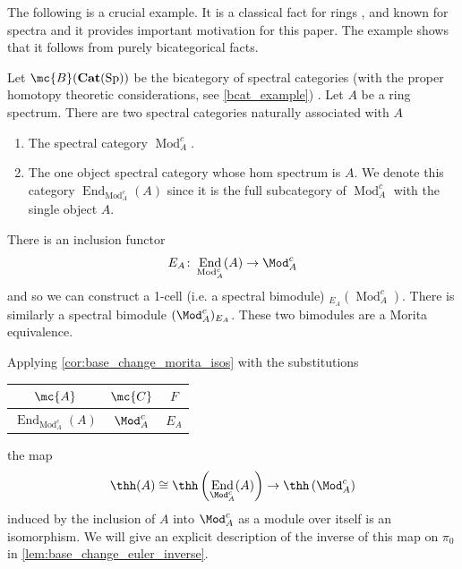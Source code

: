 \documentclass[11pt]{amsart}
\newcommand{\mbf}{\mathbf}
\DeclareMathOperator{\End}{End}
\begin{document}
The following is a crucial example. It is a classical fact for rings \cite[Prop.~2.1.5]{dundas_mccarthy}, and known for spectra \cite{blumberg_mandell} and it provides important motivation for this paper. The example shows that it follows from purely bicategorical facts.


\begin{example}\label{spectral_category_morita_equivalence}
  Let $\mc{B}(\mbf{Cat}(\operatorname{Sp}))$ be the bicategory of spectral categories (with the proper homotopy theoretic considerations, see \cref{bcat_example}) . Let $A$ be a ring spectrum. There are two spectral categories naturally associated with $A$
  \begin{enumerate}
  \item The spectral category $\operatorname{Mod}^c_A$. 
  \item The one object spectral category whose hom spectrum is $A$.  We denote this category $\End_{ \operatorname{Mod}^c_A}(A)$ since it is the full subcategory of  $\operatorname{Mod}^c_A$ with the single object $A$.
  \end{enumerate}
There is an inclusion functor 
\[
  E_A\colon  \End_{ \operatorname{Mod}^c_A}(A) \to \Mod^c_A
\] 
and so we can construct a 1-cell (i.e. a spectral bimodule) $ _{E_A} (\operatorname{Mod}^c_A)$. There is similarly a spectral bimodule  $ (\Mod^c_A)_{E_A}$. These two bimodules are a Morita equivalence.

Applying \cref{cor:base_change_morita_isos} with the substitutions
\begin{center}
  \begin{tabular}{c|c|c}
    $\mc{A}$ & $\mc{C}$ & $F$\\\hline
    $\End_{\operatorname{Mod}^c_A} (A)$ & $\Mod^c_A$ & $E_A$
  \end{tabular}
\end{center}
the map 
\begin{equation}\label{eq:thh_A_mod}
  \thh(A) \cong \thh\left(\End_{\Mod^c_A} (A)\right) \to \thh\left(\Mod^c_A\right)
\end{equation} 
induced by the inclusion of $A$ into $\Mod^c_A$ as a module over itself is an isomorphism.
We will give an explicit description of the inverse of this map on $\pi_0$ in \cref{lem:base_change_euler_inverse}.
\end{example}
\end{document}
